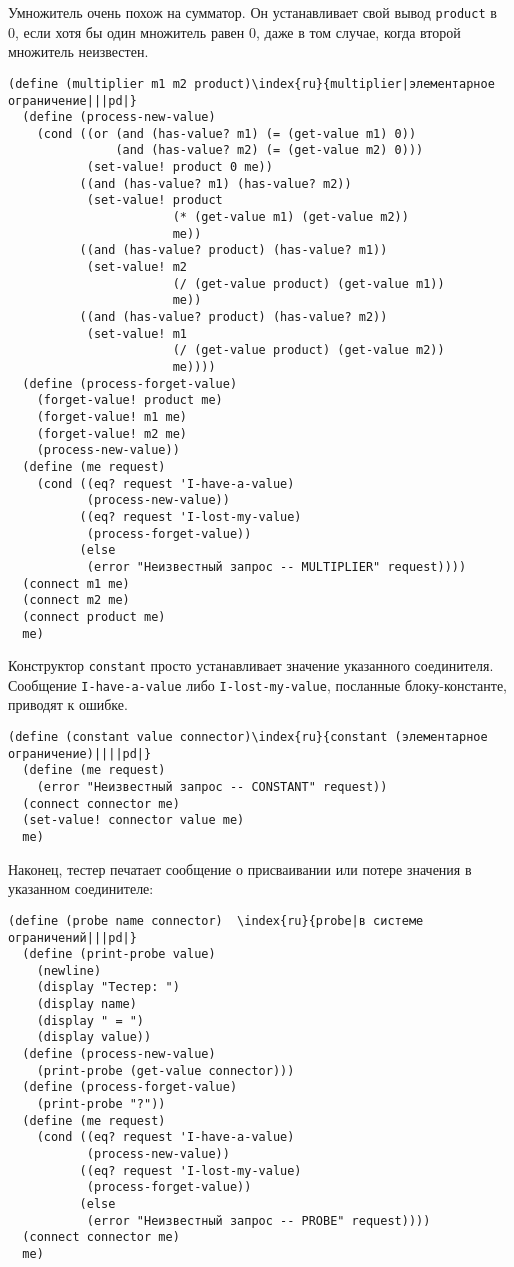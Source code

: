 Умножитель очень похож на сумматор.  Он устанавливает свой
вывод {\tt product} в 0, если хотя бы один множитель равен 0,
даже в том случае, когда второй множитель неизвестен.
{\sloppy

}

\begin{Verbatim}[fontsize=\small]
(define (multiplier m1 m2 product)\index{ru}{multiplier|элементарное ограничение|||pd|}
  (define (process-new-value)
    (cond ((or (and (has-value? m1) (= (get-value m1) 0))
               (and (has-value? m2) (= (get-value m2) 0)))
           (set-value! product 0 me))
          ((and (has-value? m1) (has-value? m2))
           (set-value! product
                       (* (get-value m1) (get-value m2))
                       me))
          ((and (has-value? product) (has-value? m1))
           (set-value! m2
                       (/ (get-value product) (get-value m1))
                       me))
          ((and (has-value? product) (has-value? m2))
           (set-value! m1
                       (/ (get-value product) (get-value m2))
                       me))))
  (define (process-forget-value)
    (forget-value! product me)
    (forget-value! m1 me)
    (forget-value! m2 me)
    (process-new-value))
  (define (me request)
    (cond ((eq? request 'I-have-a-value)
           (process-new-value))
          ((eq? request 'I-lost-my-value)
           (process-forget-value))
          (else
           (error "Неизвестный запрос -- MULTIPLIER" request))))
  (connect m1 me)
  (connect m2 me)
  (connect product me)
  me)
\end{Verbatim}
Конструктор {\tt constant} просто устанавливает значение
указанного соединителя. Сообщение {\tt I-have-a-value} либо
{\tt I-lost-my-value}, посланные блоку-константе, приводят к
ошибке.

\begin{Verbatim}[fontsize=\small]
(define (constant value connector)\index{ru}{constant (элементарное ограничение)||||pd|}
  (define (me request)
    (error "Неизвестный запрос -- CONSTANT" request))
  (connect connector me)
  (set-value! connector value me)
  me)
\end{Verbatim}
Наконец, тестер печатает сообщение о присваивании или потере значения
в указанном соединителе:

\begin{Verbatim}[fontsize=\small]
(define (probe name connector)  \index{ru}{probe|в системе ограничений|||pd|}
  (define (print-probe value)
    (newline)
    (display "Тестер: ")
    (display name)
    (display " = ")
    (display value))
  (define (process-new-value)
    (print-probe (get-value connector)))
  (define (process-forget-value)
    (print-probe "?"))
  (define (me request)
    (cond ((eq? request 'I-have-a-value)
           (process-new-value))
          ((eq? request 'I-lost-my-value)
           (process-forget-value))
          (else
           (error "Неизвестный запрос -- PROBE" request))))
  (connect connector me)
  me)
\end{Verbatim}

